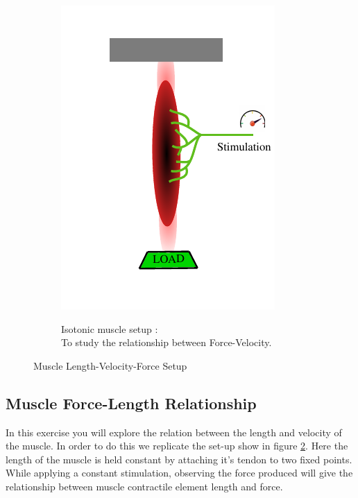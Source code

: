 \documentclass{cmc}
\begin{document}
\begin{figure}[H]
\begin{subfigure}[b]{0.49\textwidth}
{      \includegraphics[width=\textwidth]{figures/isotonic_muscle} }
    \caption{Isotonic muscle setup :\\ To study the relationship
      between Force-Velocity.}
    \label{fig:isotonic_muscle}
  \end{subfigure}
  \caption{Muscle Length-Velocity-Force Setup}
  \label{fig:muscle-setup}
\end{figure}

\subsection*{Muscle Force-Length Relationship}
\label{sec:muscle-force-length}
In this exercise you will explore the relation between the length and
velocity of the muscle. In order to do this we replicate the set-up
show in figure \ref{fig:muscle-setup}. Here the length of the muscle is
held constant by attaching it's tendon to two fixed points. While
applying a constant stimulation, observing the force produced will
give the relationship between muscle contractile element length and
force.
\end{document}
